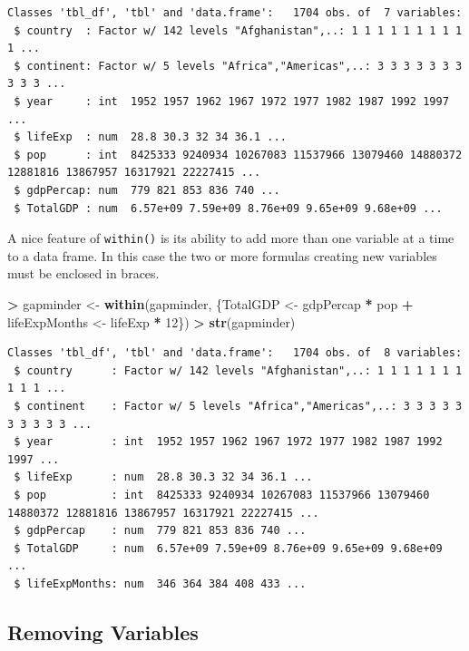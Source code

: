 \documentclass[]{krantz}
\makeatletter
\newenvironment{Shaded}{\begin{snugshade}}{\end{snugshade}}
\newcommand{\KeywordTok}[1]{\textcolor[rgb]{0.27,0.27,0.27}{\textbf{#1}}}
\newcommand{\DecValTok}[1]{\textcolor[rgb]{0.06,0.06,0.06}{#1}}
\newcommand{\StringTok}[1]{\textcolor[rgb]{0.5,0.5,0.5}{#1}}
\newcommand{\OperatorTok}[1]{\textcolor[rgb]{0.43,0.43,0.43}{\textbf{#1}}}
\newcommand{\NormalTok}[1]{#1}
\newenvironment{kframe}{%
\medskip{}
\setlength{\fboxsep}{.8em}
 \def\at@end@of@kframe{}%
 \ifinner\ifhmode%
  \def\at@end@of@kframe{\end{minipage}}%
  \begin{minipage}{\columnwidth}%
 \fi\fi%
 \def\FrameCommand##1{\hskip\@totalleftmargin \hskip-\fboxsep
 \colorbox{shadecolor}{##1}\hskip-\fboxsep
     \hskip-\linewidth \hskip-\@totalleftmargin \hskip\columnwidth}%
 \MakeFramed {\advance\hsize-\width
   \@totalleftmargin\z@ \linewidth\hsize
   \@setminipage}}%
 {\par\unskip\endMakeFramed%
 \at@end@of@kframe}
\renewenvironment{Shaded}{\begin{kframe}}{\end{kframe}}
\makeatother
\begin{document}
\begin{verbatim}
Classes 'tbl_df', 'tbl' and 'data.frame':   1704 obs. of  7 variables:
 $ country  : Factor w/ 142 levels "Afghanistan",..: 1 1 1 1 1 1 1 1 1 1 ...
 $ continent: Factor w/ 5 levels "Africa","Americas",..: 3 3 3 3 3 3 3 3 3 3 ...
 $ year     : int  1952 1957 1962 1967 1972 1977 1982 1987 1992 1997 ...
 $ lifeExp  : num  28.8 30.3 32 34 36.1 ...
 $ pop      : int  8425333 9240934 10267083 11537966 13079460 14880372 12881816 13867957 16317921 22227415 ...
 $ gdpPercap: num  779 821 853 836 740 ...
 $ TotalGDP : num  6.57e+09 7.59e+09 8.76e+09 9.65e+09 9.68e+09 ...
\end{verbatim}

A nice feature of \texttt{within()} is its ability to add more than one
variable at a time to a data frame. In this case the two or more
formulas creating new variables must be enclosed in braces.

\begin{Shaded}
\begin{Highlighting}[]
\OperatorTok{>}\StringTok{ }\NormalTok{gapminder <-}\StringTok{ }\KeywordTok{within}\NormalTok{(gapminder, \{TotalGDP <-}\StringTok{ }\NormalTok{gdpPercap }\OperatorTok{*}\StringTok{ }\NormalTok{pop}
\OperatorTok{+}\StringTok{     }\NormalTok{lifeExpMonths <-}\StringTok{ }\NormalTok{lifeExp }\OperatorTok{*}\StringTok{ }\DecValTok{12}\NormalTok{\})}
\OperatorTok{>}\StringTok{ }\KeywordTok{str}\NormalTok{(gapminder)}
\end{Highlighting}
\end{Shaded}

\begin{verbatim}
Classes 'tbl_df', 'tbl' and 'data.frame':   1704 obs. of  8 variables:
 $ country      : Factor w/ 142 levels "Afghanistan",..: 1 1 1 1 1 1 1 1 1 1 ...
 $ continent    : Factor w/ 5 levels "Africa","Americas",..: 3 3 3 3 3 3 3 3 3 3 ...
 $ year         : int  1952 1957 1962 1967 1972 1977 1982 1987 1992 1997 ...
 $ lifeExp      : num  28.8 30.3 32 34 36.1 ...
 $ pop          : int  8425333 9240934 10267083 11537966 13079460 14880372 12881816 13867957 16317921 22227415 ...
 $ gdpPercap    : num  779 821 853 836 740 ...
 $ TotalGDP     : num  6.57e+09 7.59e+09 8.76e+09 9.65e+09 9.68e+09 ...
 $ lifeExpMonths: num  346 364 384 408 433 ...
\end{verbatim}

\subsection{Removing Variables}\label{removing-variables}
\end{document}
